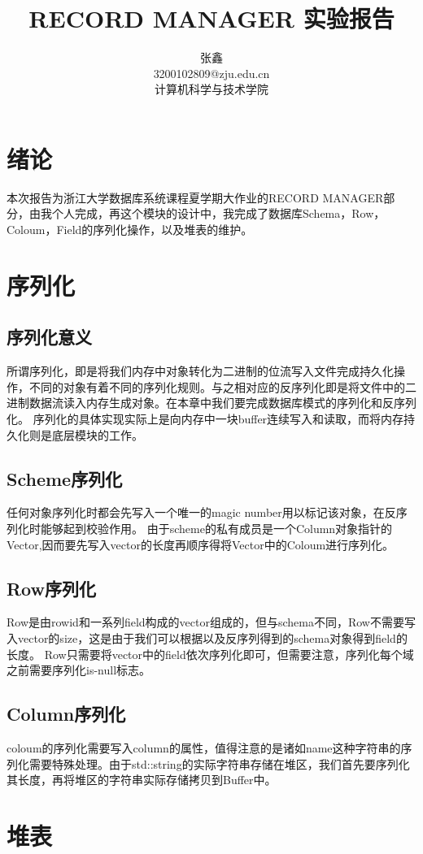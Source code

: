\documentclass{article}
\title{RECORD MANAGER 实验报告}
\author{张鑫\\3200102809@zju.edu.cn\\计算机科学与技术学院\\\date{}}
\begin{document}
\setlength{\parindent}{2em} 
\maketitle
\section[1]{绪论}
本次报告为浙江大学数据库系统课程夏学期大作业的RECORD MANAGER部分，由我个人完成，再这个模块的设计中，我完成了数据库Schema，Row，Coloum，Field的序列化操作，以及堆表的维护。
\section[2]{序列化}
\subsection[1]{序列化意义}
所谓序列化，即是将我们内存中对象转化为二进制的位流写入文件完成持久化操作，不同的对象有着不同的序列化规则。与之相对应的反序列化即是将文件中的二进制数据流读入内存生成对象。在本章中我们要完成数据库模式的序列化和反序列化。
序列化的具体实现实际上是向内存中一块buffer连续写入和读取，而将内存持久化则是底层模块的工作。
\subsection[2]{Scheme序列化}
任何对象序列化时都会先写入一个唯一的magic number用以标记该对象，在反序列化时能够起到校验作用。
由于scheme的私有成员是一个Column对象指针的Vector,因而要先写入vector的长度再顺序得将Vector中的Coloum进行序列化。
\subsection[3]{Row序列化}
Row是由rowid和一系列field构成的vector组成的，但与schema不同，Row不需要写入vector的size，这是由于我们可以根据以及反序列得到的schema对象得到field的长度。
Row只需要将vector中的field依次序列化即可，但需要注意，序列化每个域之前需要序列化is-null标志。
\subsection[4]{Column序列化}
coloum的序列化需要写入column的属性，值得注意的是诸如name这种字符串的序列化需要特殊处理。由于std::string的实际字符串存储在堆区，我们首先要序列化其长度，再将堆区的字符串实际存储拷贝到Buffer中。

\section[2]{堆表}
\end{document}
